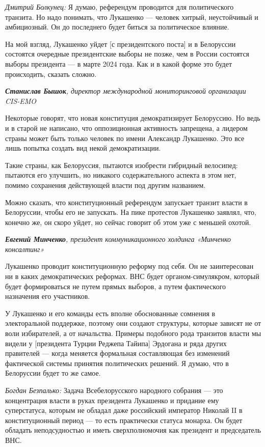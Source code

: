 \textit{Дмитрий Болкунец:} Я думаю, референдум проводится для политического транзита. Но надо понимать, что Лукашенко — человек хитрый, неустойчивый и амбициозный. Он до последнего будет биться за политическое влияние.

На мой взгляд, Лукашенко уйдет [с президентского поста] и в Белоруссии состоятся очередные президентские выборы не позже, чем в России состоятся выборы президента — в марте 2024 года. Как и в какой форме это будет происходить, сказать сложно.

\textit{\textbf{Станислав Бышок}, директор международной мониторинговой организации CIS-EMO}

Некоторые говорят, что новая конституция демократизирует Белоруссию. Но ведь и в старой не написано, что оппозиционная активность запрещена, а лидером страны может быть только человек по имени Александр Лукашенко. Это все лишь попытка создать вид некой демократизации.

Такие страны, как Белоруссия, пытаются изобрести гибридный велосипед: пытаются его улучшить, но никакого содержательного аспекта в этом нет, помимо сохранения действующей власти под другим названием.

Можно сказать, что конституционный референдум запускает транзит власти в Белоруссии, чтобы его не запускать. На пике протестов Лукашенко заявлял, что, конечно же, он скоро уйдет, но сейчас говорит об этом уже с меньшей охотой.

\textit{\textbf{Евгений Минченко}, президент коммуникационного холдинга «Минченко консалтинг» }

Лукашенко проводит конституционную реформу под себя. Он не заинтересован ни в каких демократических реформах. ВНС будет органом-симулякром, который будет формироваться не путем прямых выборов, а путем фактического назначения его участников.

У Лукашенко и его команды есть вполне обоснованные сомнения в электоральной поддержке, поэтому они создают структуры, которые зависят не от воли избирателей, а от начальства. Примеры подобного рода транзитов власти мы видели у [президента Турции Реджепа Тайипа] Эрдогана и ряда других правителей — когда меняется формальная составляющая без изменений фактической системы принятия политических решений. Я думаю, что в Белоруссии будет то же самое.

\textit{Богдан Безпалько:} Задача Всебелорусского народного собрания — это концентрация власти в руках президента Лукашенко и придание ему суперстатуса, которым не обладал даже российский император Николай II в конституционный период — то есть практически статуса монарха. Он будет обладать неподсудностью и иметь сверхполномочия как президент и председатель ВНС.

